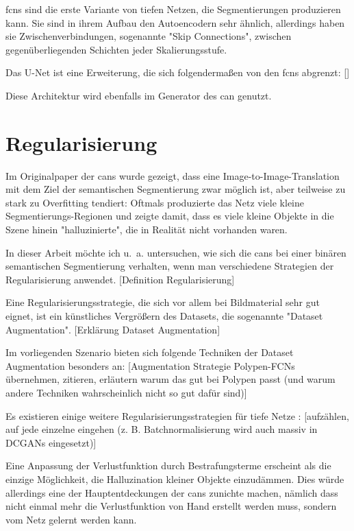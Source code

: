 \glspl{fcn} sind die erste Variante von tiefen Netzen, die Segmentierungen produzieren kann.
Sie sind in ihrem Aufbau den Autoencodern sehr ähnlich, allerdings haben sie Zwischenverbindungen, sogenannte "Skip Connections", zwischen gegenüberliegenden Schichten jeder Skalierungsstufe.

Das U-Net ist eine Erweiterung, die sich folgendermaßen von den \glspl{fcn} abgrenzt:
[]

Diese Architektur wird ebenfalls im Generator des \gls{can} genutzt.

\section{Regularisierung}

Im Originalpaper der \glspl{can} wurde gezeigt, dass eine Image-to-Image-Translation mit dem Ziel der semantischen Segmentierung zwar möglich ist, aber teilweise zu stark zu Overfitting tendiert:
Oftmals produzierte das Netz viele kleine Segmentierungs-Regionen und zeigte damit, dass es viele kleine Objekte in die Szene hinein "halluzinierte", die in Realität nicht vorhanden waren.

In dieser Arbeit möchte ich u.~a. untersuchen, wie sich die \glspl{can} bei einer binären semantischen Segmentierung verhalten, wenn man verschiedene Strategien der Regularisierung anwendet.
[Definition Regularisierung]

Eine Regularisierungsstrategie, die sich vor allem bei Bildmaterial sehr gut eignet, ist ein künstliches Vergrößern des Datasets, die sogenannte "Dataset Augmentation".
[Erklärung Dataset Augmentation]

Im vorliegenden Szenario bieten sich folgende Techniken der Dataset Augmentation besonders an:
[Augmentation Strategie Polypen-FCNs übernehmen, zitieren, erläutern warum das gut bei Polypen passt (und warum andere Techniken wahrscheinlich nicht so gut dafür sind)]

Es existieren einige weitere Regularisierungsstrategien für tiefe Netze \cite{Goodfellow.2016}:
[aufzählen, auf jede einzelne eingehen (z. B. Batchnormalisierung wird auch massiv in DCGANs eingesetzt)]

Eine Anpassung der Verlustfunktion durch Bestrafungsterme erscheint als die einzige Möglichkeit, die Halluzination kleiner Objekte einzudämmen.
Dies würde allerdings eine der Hauptentdeckungen der \glspl{can} zunichte machen, nämlich dass nicht einmal mehr die Verlustfunktion von Hand erstellt werden muss, sondern vom Netz gelernt werden kann.

